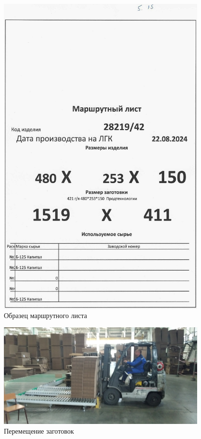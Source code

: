 \begin{figure}
\begin{center}
  \includegraphics[height=0.94\textheight, width=0.94\textwidth, keepaspectratio]{Pics 1/5.15 маршрутный лист с ГА_0001.jpg}
\end{center}
  \caption{Образец маршрутного листа}
  \label{pic:5.15 маршрутный лист с ГА_0001}
\end{figure}

\begin{figure}
\begin{center}
  \includegraphics[height=0.94\textheight, width=0.94\textwidth, keepaspectratio]{Pics 1/5 Съем заготовок с ГА.jpg}
\end{center}
  \caption{Перемещение заготовок}
  \label{pic:5 Съем заготовок с ГА}
\end{figure}

